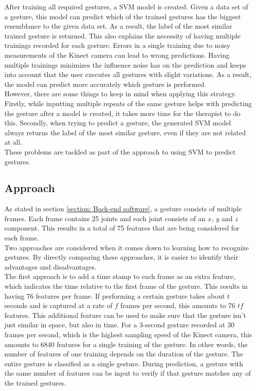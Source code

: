 After training all required gestures, a SVM model is created. Given a data set of a gesture, this model can predict which of the trained gestures has the biggest resemblance to the given data set. As a result, the label of the most similar trained gesture is returned. This also explains the necessity of having multiple trainings recorded for each gesture. Errors in a single training due to noisy measurements of the Kinect camera can lead to wrong predictions. Having multiple trainings minimizes the influence noise has on the prediction and keeps into account that the user executes all gestures with slight variations. As a result, the model can predict more accurately which gesture is performed.\\

However, there are some things to keep in mind when applying this strategy. Firstly, while inputting multiple repeats of the same gesture helps with predicting the gesture after a model is created, it takes more time for the therapist to do this. Secondly, when trying to predict a gesture, the generated SVM model always returns the label of the most similar gesture, even if they are not related at all.\\

These problems are tackled as part of the approach to using SVM to predict gestures.


\subsection{Approach}

As stated in section \ref{section: Back-end software}, a gesture consists of multiple frames. Each frame contains 25 joints and each joint consists of an $x$, $y$ and $z$ component. This results in a total of 75 features that are being considered for each frame.\\

Two approaches are considered when it comes down to learning how to recognize gestures. By directly comparing these approaches, it is easier to identify their advantages and disadvantages.\\

The first approach is to add a time stamp to each frame as an extra feature, which indicates the time relative to the first frame of the gesture. This results in having 76 features per frame. If performing a certain gesture takes about $t$ seconds and is captured at a rate of $f$ frames per second, this amounts to 76 $tf$ features. This additional feature can be used to make sure that the gesture isn't just similar in space, but also in time. For a 3-second gesture recorded at 30 frames per second, which is the highest sampling speed of the Kinect camera, this amounts to 6840 features for a single training of the gesture. In other words, the number of features of one training depends on the duration of the gesture. The entire gesture is classified as a single gesture. During prediction, a gesture with the same number of features can be input to verify if that gesture matches any of the trained gestures.\\

